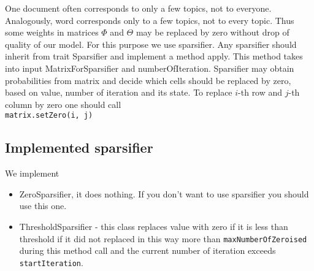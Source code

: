One document often corresponds to only a few topics, not to everyone. Analogously,
word corresponds only to a few topics, not to every topic. Thus some weights in
matrices $\Phi$ and $\Theta$ may be replaced by zero without drop of quality of our model. For this purpose we use
sparsifier. Any sparsifier should inherit from trait Sparsifier and implement a method apply. This method takes into input
MatrixForSparsifier and numberOfIteration. Sparsifier may obtain probabilities from matrix and decide which cells should be replaced
by zero, based on value, number of iteration and its state. To replace $i$\--th row and $j$\--th column by zero one should call\\
\texttt{matrix.setZero(i, j)}\\

\subsection*{Implemented sparsifier}
    We implement
    \begin{itemize}
	\item ZeroSparsifier, it does nothing. If you don't want to use sparsifier you should use this one. 
	\item ThresholdSparsifier \-- this class replaces value with zero if it is less than threshold if it did not replaced in this way more than \texttt{maxNumberOfZeroised} during this method call and the current number of iteration exceeds \texttt{startIteration}.
    \end{itemize}

